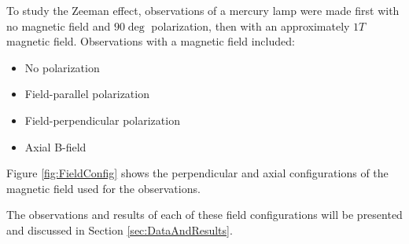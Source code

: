 \documentclass[twocolumn]{article}
\begin{document}
	To study the Zeeman effect, observations of a mercury lamp were made first with no magnetic field and $90\deg$ polarization, then with an approximately $1T$ magnetic field.
	Observations with a magnetic field included:
	\begin{itemize}
		\item No polarization
		\item Field-parallel polarization
		\item Field-perpendicular polarization 
		\item Axial B-field
	\end{itemize}
	
	Figure \ref{fig:FieldConfig} shows the perpendicular and axial configurations of the magnetic field used for the observations.
	
	The observations and results of each of these field configurations will be presented and discussed in Section \ref{sec:DataAndResults}.
	
\end{document}
